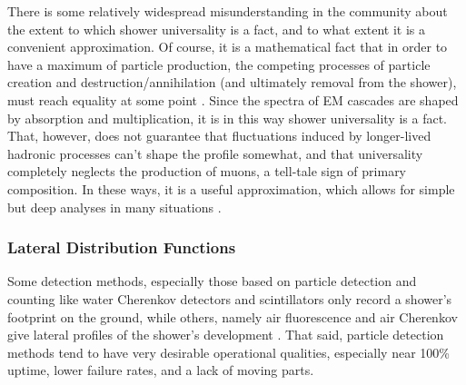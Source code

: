 There is some relatively widespread misunderstanding in the community about the extent to which shower universality is a fact, and to what extent it is a convenient approximation. Of course, it is a mathematical fact that in order to have a maximum of particle production, the competing processes of particle creation and destruction/annihilation (and ultimately removal from the shower), must reach equality at some point \cite{crapp2}.  Since the spectra of EM cascades are shaped by absorption and multiplication, it is in this way shower universality is a fact. That, however, does not guarantee that fluctuations induced by longer-lived hadronic processes can't shape the profile somewhat, and that universality completely neglects the production of muons, a tell-tale sign of primary composition. In these ways, it is a useful approximation, which allows for simple but deep analyses in many situations \cite{universality}.


\subsubsection{Lateral Distribution Functions}
\label{ldfs}
Some detection methods, especially those based on particle detection and counting like water Cherenkov detectors and scintillators only record a shower's footprint on the ground, while others, namely air fluorescence and air Cherenkov give lateral profiles of the shower's development \cite{schroeder}. That said, particle detection methods tend to have very desirable operational qualities, especially near 100\% uptime, lower failure rates, and a lack of moving parts. 

